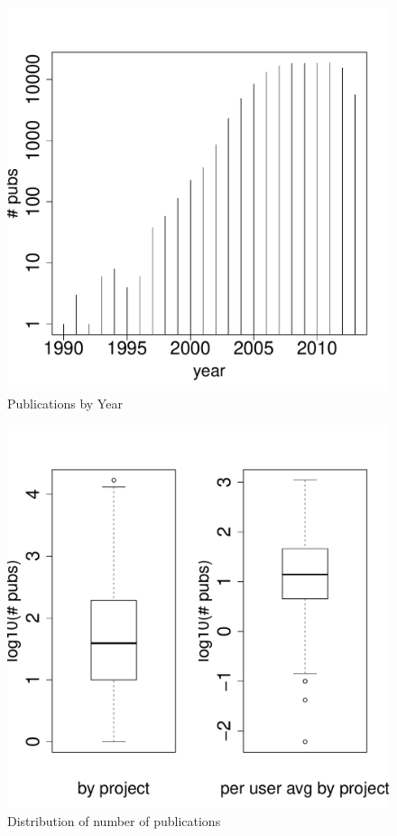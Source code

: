 \documentclass{sig-alternate}
\begin{document}
\begin{figure}[htb] 
  \centering 
    \includegraphics[width=1.0\columnwidth]{images/21_pubs_year_distribution.pdf} 
  \caption{Publications by Year}\label{F:pubs-year-distribution} 
\end{figure} 
 
\begin{figure}[htb] 
  \centering 
    \includegraphics[width=1.0\columnwidth]{images/01_dist_npubs_proj.pdf} 
  \caption{Distribution of number of publications}\label{F:dist-npubs-proj} 
\end{figure} 
 
\end{document}
